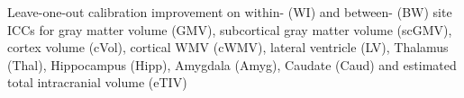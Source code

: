 \label{fig:calib} Leave-one-out calibration improvement on within- (WI) and between- (BW) site ICCs for gray matter volume (GMV), subcortical gray matter volume (scGMV), cortex volume (cVol), cortical WMV (cWMV), lateral ventricle (LV), Thalamus (Thal), Hippocampus (Hipp), Amygdala (Amyg), Caudate (Caud) and estimated total intracranial volume (eTIV)